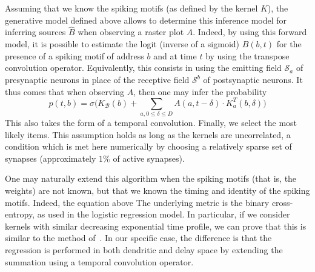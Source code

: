 \documentclass[runningheads]{llncs}
\newcommand{\presynaddr}{a} %
\newcommand{\postsynaddr}{b} %
\newcommand{\postsynaddrspace}{\mathcal{B}} %
\newcommand{\synapse}{\mathcal{S}} %
\newcommand{\synapticdelay}{\delta} %
\newcommand{\kernel}{K} %
\begin{document}
% 
Assuming that we know the spiking motifs (as defined by the kernel $\kernel$), the generative model defined above allows to determine this inference model for inferring sources $\hat{B}$ when observing a raster plot $A$. Indeed, by using this forward model, it is possible to estimate the logit (inverse of a sigmoid) $\hat{B}(b, t)$ for the presence of a spiking motif of address $b$ and at time $t$ by using the transpose convolution operator. Equivalently, this consists in using the emitting field $\synapse_\presynaddr$ of presynaptic neurons in place of the receptive field $\synapse^\postsynaddr$ of postsynaptic neurons. It thus comes that when observing $A$, then one may infer the probability
\begin{equation*}
  p(t, \postsynaddr) = \sigma\big(\kernel_\postsynaddrspace(b) + \sum_{\presynaddr,  0 \le \synapticdelay \le D} A(\presynaddr, t-\synapticdelay) \cdot \kernel^T_\presynaddr(\postsynaddr, \synapticdelay) \big)  
\end{equation*}
This also takes the form of a temporal convolution. Finally, we select the most likely items. This assumption holds as long as the kernels are uncorrelated, a condition which is met here numerically by choosing a relatively sparse set of synapses (approximately $1\%$ of active synapses).

One may naturally extend this algorithm when the spiking motifs (that is, the weights) are not known, but that we known the timing and identity of the spiking motifs. Indeed, the equation above 
The underlying metric is the binary cross-entropy, as used in the logistic regression model. In particular, if we consider kernels with similar decreasing exponential time profile, we can prove that this is similar to the method of~\cite{berens_fast_2012}. In our specific case, the difference is that the regression is performed in both dendritic and delay space by extending the summation using a temporal convolution operator. 
\end{document}
